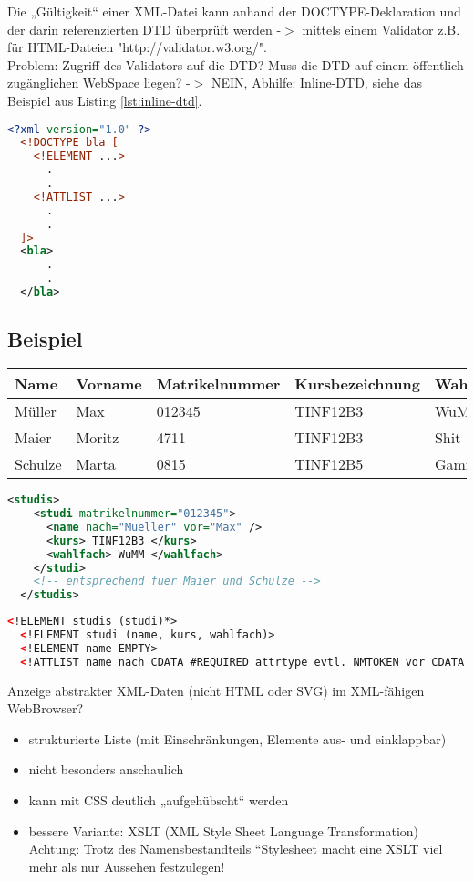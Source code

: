 \newpage
Die „Gültigkeit“ einer XML-Datei kann anhand der DOCTYPE-Deklaration und der darin referenzierten DTD überprüft werden -$>$ mittels einem Validator z.B. für HTML-Dateien "http://validator.w3.org/".\\
Problem: Zugriff des Validators auf die DTD? Muss die DTD auf einem öffentlich zugänglichen WebSpace liegen? -$>$ NEIN, Abhilfe: Inline-DTD, siehe das Beispiel aus Listing \vref{lst:inline-dtd}.
\begin{lstlisting}[caption={Inline-DTD Beispiel}, label={lst:inline-dtd}, language={XML}]
  <?xml version="1.0" ?>
  <!DOCTYPE bla [
    <!ELEMENT ...>
      .
      .
    <!ATTLIST ...>
      .
      .
  ]>
  <bla>
      .     
      .
  </bla> 
\end{lstlisting}

\newpage
\subsection{Beispiel}
\begin{tabular}{l|l|l|l|l}
\textbf{Name}	& \textbf{Vorname}	& \textbf{Matrikelnummer}	& \textbf{Kursbezeichnung}	& \textbf{Wahlfach}\\\hline
Müller	& Max		& 012345	& TINF12B3	& WuMBasis\\
Maier	& Moritz	& 4711		& TINF12B3	& Shit\\
Schulze	& Marta		& 0815		& TINF12B5	& Gaming\\
\end{tabular}	

\begin{lstlisting}[caption={Inline-DTD Beispiel}, label={lst:inline-dtd}, language={XML}]
  <studis>
    <studi matrikelnummer="012345">
      <name nach="Mueller" vor="Max" />
      <kurs> TINF12B3 </kurs>
      <wahlfach> WuMM </wahlfach>
    </studi>
    <!-- entsprechend fuer Maier und Schulze -->
  </studis>
\end{lstlisting}

\begin{lstlisting}[caption={Inline-DTD Beispiel}, label={lst:inline-dtd}, language={XML}]
  <!ELEMENT studis (studi)*>
  <!ELEMENT studi (name, kurs, wahlfach)>
  <!ELEMENT name EMPTY>
  <!ATTLIST name nach CDATA #REQUIRED attrtype evtl. NMTOKEN vor CDATA \#REQUIRED attrtype evtl. NMTOKENS>
\end{lstlisting}

Anzeige abstrakter XML-Daten (nicht HTML oder SVG) im XML-fähigen WebBrowser?
\begin{itemize}
\item strukturierte Liste (mit Einschränkungen, Elemente aus- und einklappbar)
\item nicht besonders anschaulich
\item kann mit CSS deutlich „aufgehübscht“ werden
\item bessere Variante: XSLT (XML Style Sheet Language Transformation)\\
Achtung: Trotz des Namensbestandteils “Stylesheet macht eine XSLT viel mehr als nur Aussehen festzulegen!
\end{itemize}